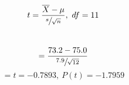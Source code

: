 \[ t=\frac{\overline{X}-\mu}{\sfrac{s}{\sqrt{n}}}, \ df=11 \]\\
    \[ =\frac{73.2-75.0}{\sfrac{7.9}{\sqrt{12}}} \]
    \[ =t=-0.7893, \ P(t)=-1.7959 \]